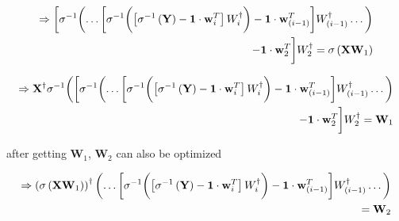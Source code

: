 \documentclass[runningheads]{llncs}
\begin{document}
\begin{equation}
    \begin{aligned}
        \Rightarrow
        \biggl[\sigma^{-1}\biggl(
        \dots
        \biggl[\sigma^{-1}\biggl(
            \left[\sigma^{-1}\left(\mathbf{Y}\right)-\mathbf{1}\cdot\mathbf{w}_{i}^{T}\right]\mathnormal{W}_{i}^\dagger
        \biggr)
        - \mathbf{1}\cdot\mathbf{w}_{(i-1)}^{T}\biggr]\mathnormal{W}_{(i-1)}^{\dagger}
        \dots\biggr)\\
        - \mathbf{1}\cdot\mathbf{w}_{2}^{T}\biggr]\mathnormal{W}_{2}^{\dagger} 
        = \sigma\left(\mathbf{X}\mathbf{W}_{1}\right)
    \end{aligned}
\end{equation}

\begin{equation}
    \begin{aligned}
        \Rightarrow
        \mathbf{X}^{\dagger}\sigma^{-1}\biggl(
        \biggl[\sigma^{-1}\biggl(
        \dots
        \biggl[\sigma^{-1}\biggl(
            \left[\sigma^{-1}\left(\mathbf{Y}\right)-\mathbf{1}\cdot\mathbf{w}_{i}^{T}\right]\mathnormal{W}_{i}^\dagger
        \biggr)
        - \mathbf{1}\cdot\mathbf{w}_{(i-1)}^{T}\biggr]\mathnormal{W}_{(i-1)}^{\dagger}
        \dots\biggr)\\
        - \mathbf{1}\cdot\mathbf{w}_{2}^{T}\biggr]\mathnormal{W}_{2}^{\dagger}
        = \mathbf{W}_{1}
    \end{aligned}
\end{equation}

after getting $\mathbf{W}_{1}$, $\mathbf{W}_{2}$ can also be optimized

\begin{equation}
    \begin{aligned}
        \Rightarrow
        \left(\sigma\left(\mathbf{X}\mathbf{W}_{1}\right)\right)^{\dagger}
        \biggl(\dots
        \biggl[\sigma^{-1}\biggl(
            \left[\sigma^{-1}\left(\mathbf{Y}\right)-\mathbf{1}\cdot\mathbf{w}_{i}^{T}\right]\mathnormal{W}_{i}^\dagger
        \biggr)
        - \mathbf{1}\cdot\mathbf{w}_{(i-1)}^{T}\biggr]\mathnormal{W}_{(i-1)}^{\dagger}
        \dots\biggr)\\
        = \mathbf{W}_{2}
    \end{aligned}
\end{equation}
\end{document}
